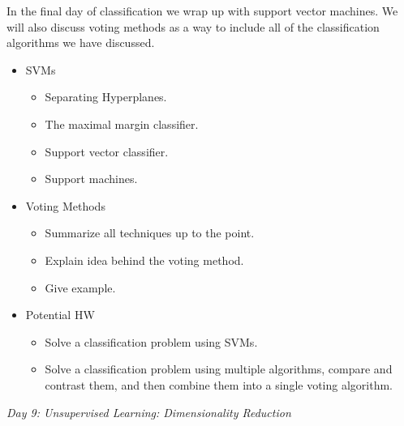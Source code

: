 \documentclass[12pt]{article}
\begin{document}
	\noindent
	In the final day of classification we wrap up with support vector machines. We will also discuss voting methods as a way to include all of the classification algorithms we have discussed.
	\begin{itemize}
		\item SVMs
			\begin{itemize}
				\item Separating Hyperplanes.
				\item The maximal margin classifier.
				\item Support vector classifier.
				\item Support machines.
			\end{itemize}
		\item Voting Methods
			\begin{itemize}
				\item Summarize all techniques up to the point.
				\item Explain idea behind the voting method.
				\item Give example.
			\end{itemize}
		\item Potential HW
			\begin{itemize}
				\item Solve a classification problem using SVMs.
				\item Solve a classification problem using multiple algorithms, compare and contrast them, and then combine them into a single voting algorithm.
			\end{itemize}
	\end{itemize}
	
	\vspace{2mm}
	\noindent
	\textit{\large{Day 9: Unsupervised Learning: Dimensionality Reduction}}
	
\end{document}
